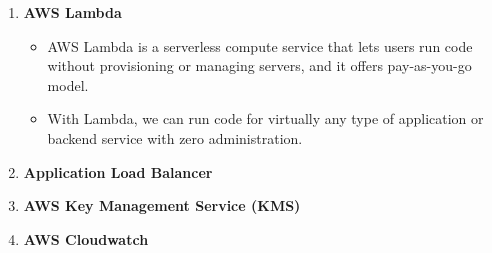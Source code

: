 \documentclass{article}
\begin{document}
\begin{enumerate}
\begin{itemize}
    \end{itemize}
    \item \textbf{AWS Lambda}
    \begin{itemize}
        \item AWS Lambda \cite{lambda} is a serverless compute service that lets users run code without provisioning or managing servers, and it offers pay-as-you-go model. 
        \item With Lambda, we can run code for virtually any type of application or backend service with zero administration.
    \end{itemize}
    \item \textbf{Application Load Balancer} \cite{alb}
    \item \textbf{AWS Key Management Service (KMS)} \cite{kms}
    \item \textbf{AWS Cloudwatch} \cite{cloudwatch}

\end{enumerate}
\end{document}
